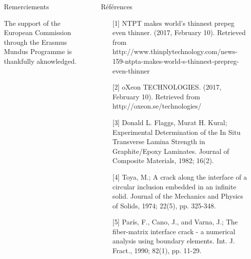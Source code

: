 \documentclass[final]{beamer}
\begin{document}
\begin{frame}

\begin{center}
\begin{minipage}{\textwidth}
\begin{columns}[totalwidth=0.925\textwidth]
\begin{column}{0.45\textwidth}
\begin{block}{\rule[-0.6ex]{0pt}{50pt}\centering Remerciements}
\centering\scriptsize The support of the European Commission through the Erasmus Mundus Programme is thankfully aknowledged.
\end{block}
\end{column}
\begin{column}{0.45\textwidth}
\begin{block}{\rule[-0.6ex]{0pt}{50pt}\centering R\'ef\'erences}
\centering
\tiny
\begin{enumerate}
\item[{[}1{]}] NTPT makes world's thinnest prepeg even thinner. (2017, February 10). Retrieved from http://www.thinplytechnology.com/news-159-ntpta-makes-world-s-thinnest-prepreg-even-thinner
\item[{[}2{]}] oXeon TECHNOLOGIES. (2017, February 10). Retrieved from http://oxeon.se/technologies/
\item[{[}3{]}] Donald L. Flaggs, Murat H. Kural; Experimental Determination of the In Situ Transverse Lamina Strength in Graphite/Epoxy Laminates.  Journal of Composite Materials, 1982; 16(2).
\item[{[}4{]}] Toya, M.; A crack along the interface of a circular inclusion embedded in an infinite solid. Journal of the Mechanics and Physics of Solids, 1974; 22(5), pp. 325-348.
\item[{[}5{]}] Par\'is, F., Cano, J., and Varna, J.; The fiber-matrix interface crack - a numerical analysis using boundary elements. Int. J. Fract., 1990; 82(1), pp. 11-29.
\end{enumerate}
\end{block}
\end{column}
\end{columns}
\end{minipage}
\end{center}

\end{frame}
\end{document}
